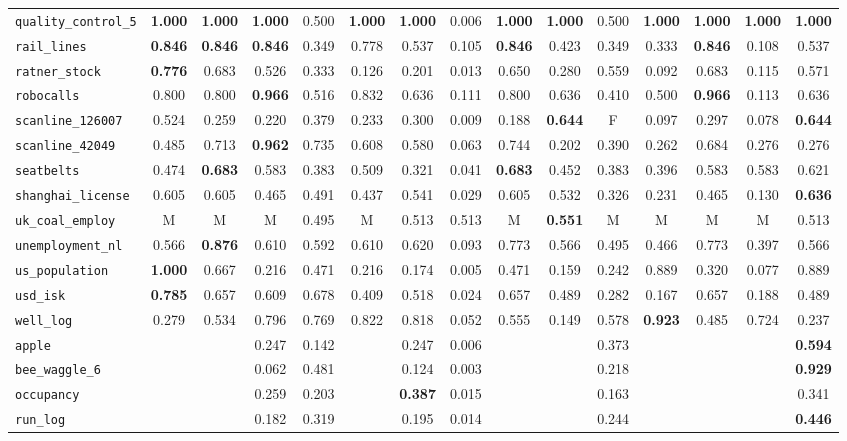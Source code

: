 \begin{tabular}{lcccccccccccccc}
\verb+quality_control_5+ & \textbf{1.000} & \textbf{1.000} & \textbf{1.000} & 0.500 & \textbf{1.000} & \textbf{1.000} & 0.006 & \textbf{1.000} & \textbf{1.000} & 0.500 & \textbf{1.000} & \textbf{1.000} & \textbf{1.000} & \textbf{1.000}\\
\verb+rail_lines+ & \textbf{0.846} & \textbf{0.846} & \textbf{0.846} & 0.349 & 0.778 & 0.537 & 0.105 & \textbf{0.846} & 0.423 & 0.349 & 0.333 & \textbf{0.846} & 0.108 & 0.537\\
\verb+ratner_stock+ & \textbf{0.776} & 0.683 & 0.526 & 0.333 & 0.126 & 0.201 & 0.013 & 0.650 & 0.280 & 0.559 & 0.092 & 0.683 & 0.115 & 0.571\\
\verb+robocalls+ & 0.800 & 0.800 & \textbf{0.966} & 0.516 & 0.832 & 0.636 & 0.111 & 0.800 & 0.636 & 0.410 & 0.500 & \textbf{0.966} & 0.113 & 0.636\\
\verb+scanline_126007+ & 0.524 & 0.259 & 0.220 & 0.379 & 0.233 & 0.300 & 0.009 & 0.188 & \textbf{0.644} & F & 0.097 & 0.297 & 0.078 & \textbf{0.644}\\
\verb+scanline_42049+ & 0.485 & 0.713 & \textbf{0.962} & 0.735 & 0.608 & 0.580 & 0.063 & 0.744 & 0.202 & 0.390 & 0.262 & 0.684 & 0.276 & 0.276\\
\verb+seatbelts+ & 0.474 & \textbf{0.683} & 0.583 & 0.383 & 0.509 & 0.321 & 0.041 & \textbf{0.683} & 0.452 & 0.383 & 0.396 & 0.583 & 0.583 & 0.621\\
\verb+shanghai_license+ & 0.605 & 0.605 & 0.465 & 0.491 & 0.437 & 0.541 & 0.029 & 0.605 & 0.532 & 0.326 & 0.231 & 0.465 & 0.130 & \textbf{0.636}\\
\verb+uk_coal_employ+ & M & M & M & 0.495 & M & 0.513 & 0.513 & M & \textbf{0.551} & M & M & M & M & 0.513\\
\verb+unemployment_nl+ & 0.566 & \textbf{0.876} & 0.610 & 0.592 & 0.610 & 0.620 & 0.093 & 0.773 & 0.566 & 0.495 & 0.466 & 0.773 & 0.397 & 0.566\\
\verb+us_population+ & \textbf{1.000} & 0.667 & 0.216 & 0.471 & 0.216 & 0.174 & 0.005 & 0.471 & 0.159 & 0.242 & 0.889 & 0.320 & 0.077 & 0.889\\
\verb+usd_isk+ & \textbf{0.785} & 0.657 & 0.609 & 0.678 & 0.409 & 0.518 & 0.024 & 0.657 & 0.489 & 0.282 & 0.167 & 0.657 & 0.188 & 0.489\\
\verb+well_log+ & 0.279 & 0.534 & 0.796 & 0.769 & 0.822 & 0.818 & 0.052 & 0.555 & 0.149 & 0.578 & \textbf{0.923} & 0.485 & 0.724 & 0.237\\
\hline
\verb+apple+ &  &  & 0.247 & 0.142 &  & 0.247 & 0.006 &  &  & 0.373 &  &  &  & \textbf{0.594}\\
\verb+bee_waggle_6+ &  &  & 0.062 & 0.481 &  & 0.124 & 0.003 &  &  & 0.218 &  &  &  & \textbf{0.929}\\
\verb+occupancy+ &  &  & 0.259 & 0.203 &  & \textbf{0.387} & 0.015 &  &  & 0.163 &  &  &  & 0.341\\
\verb+run_log+ &  &  & 0.182 & 0.319 &  & 0.195 & 0.014 &  &  & 0.244 &  &  &  & \textbf{0.446}\\
\hline
\end{tabular}
